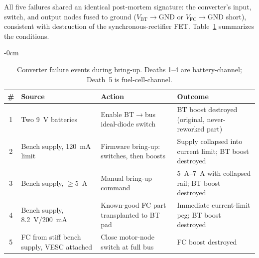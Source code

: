 
All five failures shared an identical post-mortem signature: the converter's input,
switch, and output nodes fused to ground ($V_\mathrm{BT}\!\rightarrow\!\mathrm{GND}$
or $V_\mathrm{FC}\!\rightarrow\!\mathrm{GND}$ short), consistent with destruction of
the synchronous-rectifier FET. Table~\ref{tab:deaths} summarizes the conditions.

\begin{table}[H]
\caption{Converter failure events during bring-up. Deaths 1--4 are battery-channel;
Death~5 is fuel-cell-channel.\label{tab:deaths}}
\begin{adjustwidth}{-\extralength}{0cm}
\centering
\begin{tabular}{clll}
\toprule
\textbf{\#} & \textbf{Source} & \textbf{Action} & \textbf{Outcome} \\
\midrule
1 & Two \SI{9}{\volt} batteries & Enable BT$\rightarrow$bus ideal-diode switch & BT boost destroyed (original, never-reworked part) \\
2 & Bench supply, \SI{120}{\milli\ampere} limit & Firmware bring-up: switches, then boosts & Supply collapsed into current limit; BT boost destroyed \\
3 & Bench supply, $\geq$\SI{5}{\ampere} & Manual bring-up command & \SIrange{5}{7}{\ampere} with collapsed rail; BT boost destroyed \\
4 & Bench supply, \SI{8.2}{\volt}/\SI{200}{\milli\ampere} & Known-good FC part transplanted to BT pad & Immediate current-limit peg; BT boost destroyed \\
5 & FC from stiff bench supply, VESC attached & Close motor-node switch at full bus & FC boost destroyed \\
\bottomrule
\end{tabular}
\end{adjustwidth}
\end{table}


